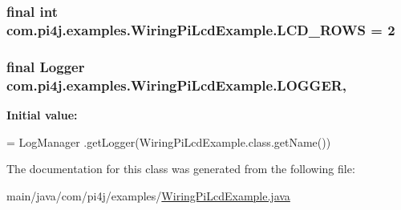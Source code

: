 \subsubsection[{L\+C\+D\+\_\+\+R\+O\+W\+S}]{\setlength{\rightskip}{0pt plus 5cm}final int com.\+pi4j.\+examples.\+Wiring\+Pi\+Lcd\+Example.\+L\+C\+D\+\_\+\+R\+O\+W\+S = 2\hspace{0.3cm}{\ttfamily [static]}}\label{classcom_1_1pi4j_1_1examples_1_1WiringPiLcdExample_a821e07d27f9a2ba9115e88fd45c57167}
\hypertarget{classcom_1_1pi4j_1_1examples_1_1WiringPiLcdExample_ab24da6409b7984edeb55902dbd5e3f8f}{}
\subsubsection[{L\+O\+G\+G\+E\+R}]{\setlength{\rightskip}{0pt plus 5cm}final Logger com.\+pi4j.\+examples.\+Wiring\+Pi\+Lcd\+Example.\+L\+O\+G\+G\+E\+R\hspace{0.3cm}{\ttfamily [static]}, {\ttfamily [private]}}\label{classcom_1_1pi4j_1_1examples_1_1WiringPiLcdExample_ab24da6409b7984edeb55902dbd5e3f8f}
{\bfseries Initial value\+:}
\begin{DoxyCode}
= LogManager
            .getLogger(WiringPiLcdExample.class.getName())
\end{DoxyCode}


The documentation for this class was generated from the following file\+:\begin{DoxyCompactItemize}
\item 
main/java/com/pi4j/examples/\hyperlink{WiringPiLcdExample_8java}{Wiring\+Pi\+Lcd\+Example.\+java}\end{DoxyCompactItemize}
